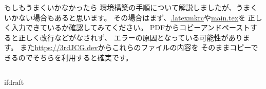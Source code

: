 		\begin{column}{もしもうまくいかなかったら}
			環境構築の手順について解説しましたが、うまくいかない場合もあると思います。
			その場合はまず、\url{.latexmkrc}や\url{main.tex}を
			正しく入力できているか確認してみてください。
			PDFからコピーアンドペーストすると正しく改行などがなされず、
			エラーの原因となっている可能性があります。
			また\url{https://3rdJCG.dev}からこれらのファイルの内容を
			そのままコピーできるのでそちらを利用すると確実です。
		\end{column}

\expandafter\ifx\csname ifdraft\endcsname\relax
	
\fi
